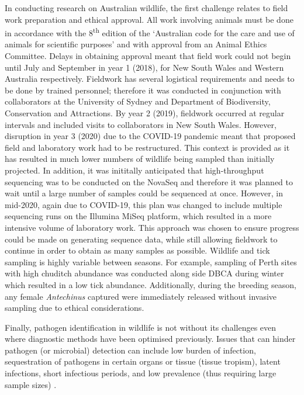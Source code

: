 \documentclass[a4paper, nobind]{templates/ociamthesis}
\begin{document}
In conducting research on Australian wildlife, the first challenge relates to field work preparation and ethical approval.
All work involving animals must be done in accordance with the 8\textsuperscript{th} edition of the `Australian code for the care and use of animals for scientific purposes' \autocite{nationalhealthandmedicalresearchcouncilAustralianCodeCare2013} and with approval from an Animal Ethics Committee.
Delays in obtaining approval meant that field work could not begin until July and September in year 1 (2018), for New South Wales and Western Australia respectively.
Fieldwork has several logistical requirements and needs to be done by trained personnel; therefore it was conducted in conjunction with collaborators at the University of Sydney and Department of Biodiversity, Conservation and Attractions.
By year 2 (2019), fieldwork occurred at regular intervals and included visits to collaborators in New South Wales.
However, disruption in year 3 (2020) due to the COVID-19 pandemic meant that proposed field and laboratory work had to be restructured.
This context is provided as it has resulted in much lower numbers of wildlife being sampled than initially projected.
In addition, it was inititally anticipated that high-throughput sequencing was to be conducted on the NovaSeq and therefore it was planned to wait until a large number of samples could be sequenced at once.
However, in mid-2020, again due to COVID-19, this plan was changed to include multiple sequencing runs on the Illumina MiSeq platform, which resulted in a more intensive volume of laboratory work.
This approach was chosen to ensure progress could be made on generating sequence data, while still allowing fieldwork to continue in order to obtain as many samples as possible.
Wildlife and tick sampling is highly variable between seasons.
For example, sampling of Perth sites with high chuditch abundance was conducted along side DBCA during winter which resulted in a low tick abundance.
Additionally, during the breeding season, any female \emph{Antechinus} captured were immediately released without invasive sampling due to ethical considerations.

Finally, pathogen identification in wildlife is not without its challenges even where diagnostic methods have been optimised previously.
Issues that can hinder pathogen (or microbial) detection can include low burden of infection, sequestration of pathogens in certain organs or tissue (tissue tropism), latent infections, short infectious periods, and low prevalence (thus requiring large sample sizes) \autocite{gilbertDecipheringSerologyUnderstand2013}.
\end{document}
